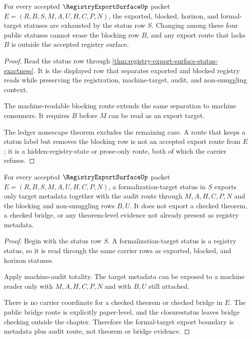 \begin{theorem}
\label{thm:registry-export-surface-status-blocking-exhaustion}
For every accepted $\RegistryExportSurfaceUp$ packet $E=(R,B,S,M,A,U,H,C,P,N)$, the exported, blocked, horizon, and formal-target statuses are exhausted by the status row $S$. Changing among these four public statuses cannot erase the blocking row $B$, and any export route that lacks $B$ is outside the accepted registry surface.
\end{theorem}
\begin{proof}
Read the status row through \autoref{thm:registry-export-surface-status-exactness}. It is the displayed row that separates exported and blocked registry reads while preserving the registration, machine-target, audit, and non-smuggling context.

The machine-readable blocking route extends the same separation to machine consumers. It requires $B$ before $M$ can be read as an export target.

The ledger nonescape theorem excludes the remaining case. A route that keeps a status label but removes the blocking row is not an accepted export route from $E$; it is a hidden-registry-state or prose-only route, both of which the carrier refuses.
\end{proof}

\begin{theorem}
\label{thm:registry-export-surface-formal-target-export-boundary}
For every accepted $\RegistryExportSurfaceUp$ packet $E=(R,B,S,M,A,U,H,C,P,N)$, a formalization-target status in $S$ exports only target metadata together with the audit route through $M,A,H,C,P,N$ and the blocking and non-smuggling rows $B,U$. It does not export a checked theorem, a checked bridge, or any theorem-level evidence not already present as registry metadata.
\end{theorem}
\begin{proof}
Begin with the status row $S$. A formalization-target status is a registry status, so it is read through the same carrier rows as exported, blocked, and horizon statuses.

Apply machine-audit totality. The target metadata can be exposed to a machine reader only with $M,A,H,C,P,N$ and with $B,U$ still attached.

There is no carrier coordinate for a checked theorem or checked bridge in $E$. The public bridge route is explicitly paper-level, and the closurestatus leaves bridge checking outside the chapter. Therefore the formal-target export boundary is metadata plus audit route, not theorem or bridge evidence.
\end{proof}

